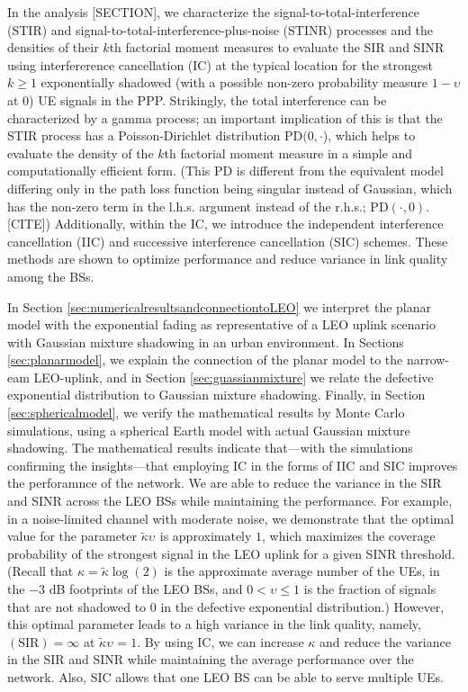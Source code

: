 \documentclass[lettersize,journal]{IEEEtran}
\begin{document}
In the analysis [SECTION], we characterize the signal-to-total-interference (STIR) and signal-to-total-interference-plus-noise (STINR) processes and the densities of their $k$th factorial moment measures to evaluate the SIR and SINR using interfererence cancellation (IC) at the typical location for the strongest $k \geq 1$ exponentially shadowed (with a possible non-zero probability measure $1-\upsilon$ at $0$) UE signals in the PPP. Strikingly, the total interference can be characterized by a gamma process; an important implication of this is that the STIR process has a Poisson-Dirichlet distribution PD$(0,\cdot$), which helps to evaluate the density of the $k$th factorial moment measure in a simple and computationally efficient form. (This PD is different from the equivalent model differing only in the path loss function being singular instead of Gaussian, which has the non-zero term in the l.h.s. argument instead of the r.h.s.; PD$(\cdot,0)$. [CITE]) Additionally, within the IC, we introduce the independent interference cancellation (IIC) and successive interference cancellation (SIC) schemes. These methods are shown to optimize performance and reduce variance in link quality among the BSs.



In Section \ref{sec:numericalresultsandconnectiontoLEO} we interpret the planar model with the exponential fading as representative of a LEO uplink scenario with Gaussian mixture shadowing in an urban environment. In Sections \ref{sec:planarmodel}, we explain the connection of the planar model to the narrow-eam LEO-uplink, and in Section \ref{sec:guassianmixture} we relate the defective exponential distribution to Gaussian mixture shadowing. Finally, in Section \ref{sec:sphericalmodel}, we verify the mathematical results by Monte Carlo simulations, using a spherical Earth model with actual Gaussian mixture shadowing. The mathematical results indicate that---with the simulations confirming the insights---that employing IC in the forms of IIC and SIC improves the perforamnce of the network. We are able to reduce the variance in the SIR and SINR across the LEO BSs while maintaining the performance. For example, in a noise-limited channel with moderate noise, we demonstrate that the optimal value for the parameter $\tilde{\kappa} \upsilon_{}$ is approximately $1$, which maximizes the coverage probability of the strongest signal in the LEO uplink for a given SINR threshold. (Recall that $\kappa=\tilde{\kappa} \log(2)$ is the approximate average number of the UEs, in the $-3$ dB footprints of the LEO BSs, and $0<\upsilon \leq 1$ is the fraction of signals that are not shadowed to $0$ in the defective exponential distribution.) However, this optimal parameter leads to a high variance in the link quality, namely, $(\text{SIR})=\infty$ at $\tilde{\kappa} \upsilon_{}=1$. By using IC, we can increase $\kappa$ and reduce the variance in the SIR and SINR while maintaining the average performance over the network. Also, SIC allows that one LEO BS can be able to serve multiple UEs.
\end{document}
